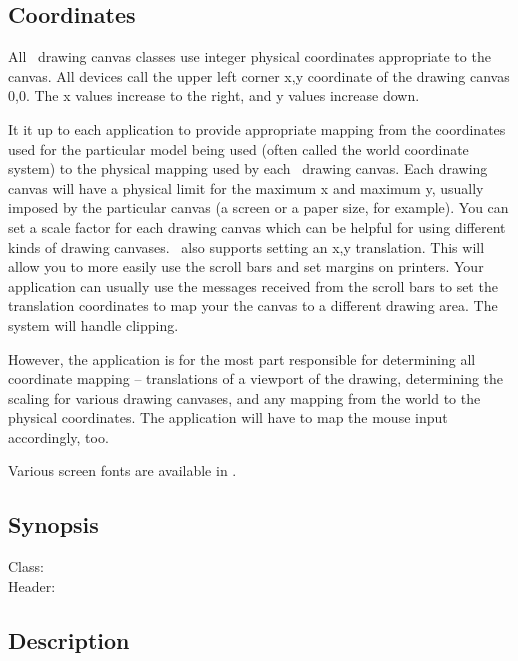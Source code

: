 \subsection{Coordinates}

All \V\ drawing canvas classes use integer physical coordinates
appropriate to the canvas. All devices call the upper left corner
x,y coordinate of the drawing canvas 0,0. The x values increase
to the right, and y values increase down.

It it up to each application to provide appropriate mapping
from the coordinates used for the particular model being used
(often called the world coordinate system) to the physical
mapping used by each \V\ drawing canvas. Each drawing canvas
will have a physical limit for the maximum x and maximum y,
usually imposed by the particular canvas (a screen or a paper
size, for example). You can set a scale factor for each drawing
canvas which can be helpful for using different kinds of drawing
canvases. \V\ also supports setting an x,y translation. This will
allow you to more easily use the scroll bars and set margins
on printers. Your application can usually use the messages
received from the scroll bars to set the translation coordinates
to map your the canvas to a different drawing area. The system
will handle clipping.

However, the application is for the most part responsible
for determining all coordinate mapping -- translations of
a viewport of the drawing, determining the scaling for
various drawing canvases, and any mapping from the world
to the physical coordinates. The application will have to
map the mouse input accordingly, too.



Various screen fonts are available in \V\@.

\subsection* {Synopsis}

\begin{description}
	\item [Class:] 
	\item [Header:] 
\end{description}

\subsection* {Description}

